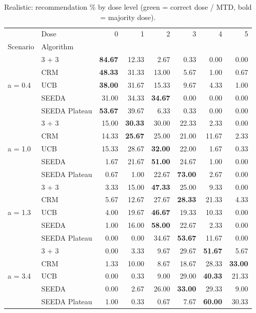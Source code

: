 \begin{table}
\centering
\caption{Realistic: recommendation \% by dose level (green = correct dose / MTD, bold = majority dose).}
\label{tab:real_rec_by_dose}
\begin{tabular}{llrrrrrr}
\toprule
 & Dose & 0 & 1 & 2 & 3 & 4 & 5 \\
Scenario & Algorithm &  &  &  &  &  &  \\
\midrule
\multirow[c]{5}{*}{a = 0.4} & 3 + 3 & {\cellcolor[HTML]{C8E6C9}} \bfseries 84.67 & 12.33 & 2.67 & 0.33 & 0.00 & 0.00 \\
 & CRM & {\cellcolor[HTML]{C8E6C9}} \bfseries 48.33 & 31.33 & 13.00 & 5.67 & 1.00 & 0.67 \\
 & UCB & {\cellcolor[HTML]{C8E6C9}} \bfseries 38.00 & 31.67 & 15.33 & 9.67 & 4.33 & 1.00 \\
 & SEEDA & {\cellcolor[HTML]{C8E6C9}} 31.00 & 34.33 & \bfseries 34.67 & 0.00 & 0.00 & 0.00 \\
 & SEEDA Plateau & {\cellcolor[HTML]{C8E6C9}} \bfseries 53.67 & 39.67 & 6.33 & 0.33 & 0.00 & 0.00 \\
\multirow[c]{5}{*}{a = 1.0} & 3 + 3 & 15.00 & \bfseries 30.33 & 30.00 & {\cellcolor[HTML]{C8E6C9}} 22.33 & 2.33 & 0.00 \\
 & CRM & 14.33 & \bfseries 25.67 & 25.00 & {\cellcolor[HTML]{C8E6C9}} 21.00 & 11.67 & 2.33 \\
 & UCB & 15.33 & 28.67 & \bfseries 32.00 & {\cellcolor[HTML]{C8E6C9}} 22.00 & 1.67 & 0.33 \\
 & SEEDA & 1.67 & 21.67 & \bfseries 51.00 & {\cellcolor[HTML]{C8E6C9}} 24.67 & 1.00 & 0.00 \\
 & SEEDA Plateau & 0.67 & 1.00 & 22.67 & {\cellcolor[HTML]{C8E6C9}} \bfseries 73.00 & 2.67 & 0.00 \\
\multirow[c]{5}{*}{a = 1.3} & 3 + 3 & 3.33 & 15.00 & \bfseries 47.33 & {\cellcolor[HTML]{C8E6C9}} 25.00 & 9.33 & 0.00 \\
 & CRM & 5.67 & 12.67 & 27.67 & {\cellcolor[HTML]{C8E6C9}} \bfseries 28.33 & 21.33 & 4.33 \\
 & UCB & 4.00 & 19.67 & \bfseries 46.67 & {\cellcolor[HTML]{C8E6C9}} 19.33 & 10.33 & 0.00 \\
 & SEEDA & 1.00 & 16.00 & \bfseries 58.00 & {\cellcolor[HTML]{C8E6C9}} 22.67 & 2.33 & 0.00 \\
 & SEEDA Plateau & 0.00 & 0.00 & 34.67 & {\cellcolor[HTML]{C8E6C9}} \bfseries 53.67 & 11.67 & 0.00 \\
\multirow[c]{5}{*}{a = 3.4} & 3 + 3 & 0.00 & 3.33 & 9.67 & 29.67 & \bfseries 51.67 & {\cellcolor[HTML]{C8E6C9}} 5.67 \\
 & CRM & 1.33 & 10.00 & 8.67 & 18.67 & 28.33 & {\cellcolor[HTML]{C8E6C9}} \bfseries 33.00 \\
 & UCB & 0.00 & 0.33 & 9.00 & 29.00 & \bfseries 40.33 & {\cellcolor[HTML]{C8E6C9}} 21.33 \\
 & SEEDA & 0.00 & 2.67 & 26.00 & \bfseries 33.00 & 29.33 & {\cellcolor[HTML]{C8E6C9}} 9.00 \\
 & SEEDA Plateau & 1.00 & 0.33 & 0.67 & 7.67 & \bfseries 60.00 & {\cellcolor[HTML]{C8E6C9}} 30.33 \\
\bottomrule
\end{tabular}
\end{table}
